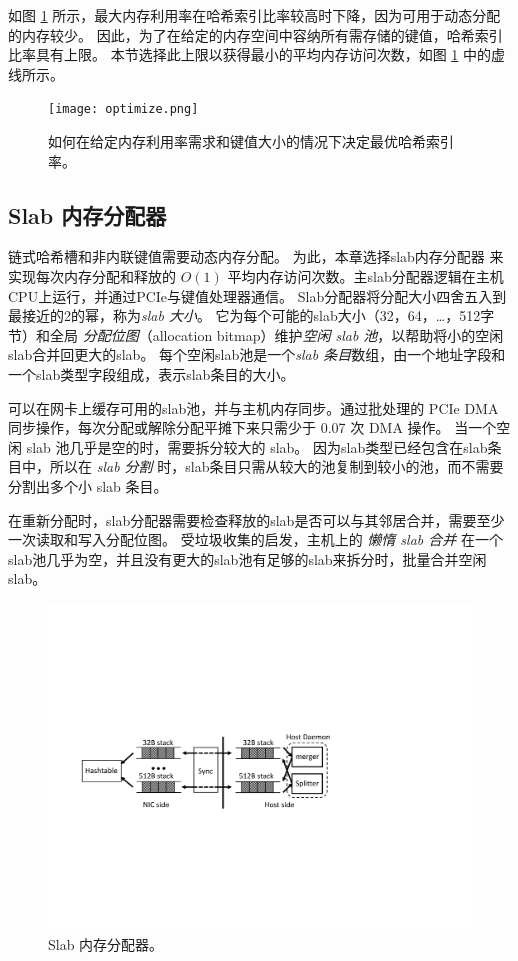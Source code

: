 如图 \ref {kvdirect:fig:hashline-ratio} 所示，最大内存利用率在哈希索引比率较高时下降，因为可用于动态分配的内存较少。
因此，为了在给定的内存空间中容纳所有需存储的键值，哈希索引比率具有上限。
本节选择此上限以获得最小的平均内存访问次数，如图 \ref {kvdirect:fig:hashline-ratio} 中的虚线所示。


\begin{figure}[htbp]
	\centering
	\texttt{[image: optimize.png]}
	\caption{如何在给定内存利用率需求和键值大小的情况下决定最优哈希索引率。}
	\label{kvdirect:fig:hashline-ratio}
\end{figure}





\subsection{Slab 内存分配器}
\label{kvdirect:sec:slab}

链式哈希槽和非内联键值需要动态内存分配。
为此，本章选择slab内存分配器 \cite {bonwick1994slab} 来实现每次内存分配和释放的 $O(1)$ 平均内存访问次数。主slab分配器逻辑在主机CPU上运行，并通过PCIe与键值处理器通信。
Slab分配器将分配大小四舍五入到最接近的2的幂，称为\textit {slab 大小}。
它为每个可能的slab大小（32，64，\ldots，512字节）和全局 \textit {分配位图}（allocation bitmap）维护\textit {空闲 slab 池}，以帮助将小的空闲slab合并回更大的slab。
每个空闲slab池是一个\textit {slab 条目}数组，由一个地址字段和一个slab类型字段组成，表示slab条目的大小。

可以在网卡上缓存可用的slab池，并与主机内存同步。通过批处理的 PCIe DMA 同步操作，每次分配或解除分配平摊下来只需少于 0.07 次 DMA 操作。
当一个空闲 slab 池几乎是空的时，需要拆分较大的 slab。
因为slab类型已经包含在slab条目中，所以在 \textit {slab 分割} 时，slab条目只需从较大的池复制到较小的池，而不需要分割出多个小 slab 条目。

在重新分配时，slab分配器需要检查释放的slab是否可以与其邻居合并，需要至少一次读取和写入分配位图。
受垃圾收集的启发，主机上的 \textit {懒惰 slab 合并} 在一个slab池几乎为空，并且没有更大的slab池有足够的slab来拆分时，批量合并空闲slab。


\begin{figure}[htbp]
	\centering
	\includegraphics[width=.8\textwidth,page=1]{figure/cropped_slab.pdf}
	\caption{Slab 内存分配器。}
	\label{kvdirect:fig:slab}
\end{figure}

